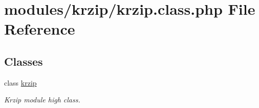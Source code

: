 \hypertarget{krzip_8class_8php}{\section{modules/krzip/krzip.class.\-php File Reference}
\label{krzip_8class_8php}
}
\subsection*{Classes}
\begin{DoxyCompactItemize}
\item 
class \hyperlink{classkrzip}{krzip}
\begin{DoxyCompactList}\small\item\em Krzip module high class. \end{DoxyCompactList}\end{DoxyCompactItemize}
